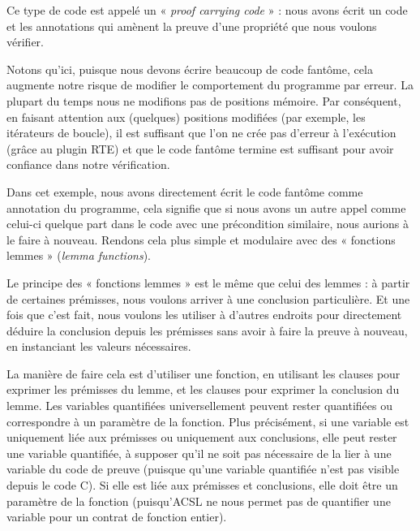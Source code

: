 



Ce type de code est appelé un « \textit{proof carrying code} » : nous avons écrit
un code et les annotations qui amènent la preuve d'une propriété que nous voulons
vérifier.


Notons qu'ici, puisque nous devons écrire beaucoup de code fantôme, cela augmente
notre risque de modifier le comportement du programme par erreur. La plupart du
temps nous ne modifions pas de positions mémoire. Par conséquent, en faisant
attention aux (quelques) positions modifiées (par exemple, les itérateurs de
boucle), il est suffisant que l'on ne crée pas d'erreur à l'exécution (grâce au
plugin RTE) et que le code fantôme termine est suffisant pour avoir confiance
dans notre vérification.


Dans cet exemple, nous avons directement écrit le code fantôme comme annotation du
programme, cela signifie que si nous avons un autre appel comme celui-ci quelque
part dans le code avec une précondition similaire, nous aurions à le faire à
nouveau. Rendons cela plus simple et modulaire avec des « fonctions lemmes »
(\textit{lemma functions}).





Le principe des « fonctions lemmes » est le même que celui des lemmes : à
partir de certaines prémisses, nous voulons arriver à une conclusion particulière.
Et une fois que c'est fait, nous voulons les utiliser à d'autres endroits pour 
directement déduire la conclusion depuis les prémisses sans avoir à faire la
preuve à nouveau, en instanciant les valeurs nécessaires.


La manière de faire cela est d'utiliser une fonction, en utilisant les clauses
 pour exprimer les prémisses du lemme, et les clauses
 pour exprimer la conclusion du lemme. Les variables
quantifiées universellement peuvent rester quantifiées ou correspondre à un
paramètre de la fonction. Plus précisément, si une variable est uniquement liée
aux prémisses ou uniquement aux conclusions, elle peut rester une variable
quantifiée, à supposer qu'il ne soit pas nécessaire de la lier à une variable
du code de preuve (puisque qu'une variable quantifiée n'est pas visible depuis
le code C). Si elle est liée aux prémisses et conclusions, elle doit être un
paramètre de la fonction (puisqu'ACSL ne nous permet pas de quantifier une
variable pour un contrat de fonction entier).


